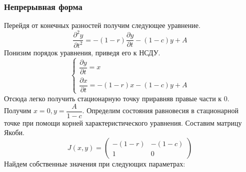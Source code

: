 \subsubsection{Непрерывная форма}
Перейдя от конечных разностей получим следующее уравнение.
\begin{equation}
  \dfrac{\partial^2y}{\partial t^2}=-(1-r)\dfrac{\partial y}{\partial t}-(1-c)y+A
\end{equation}
Понизим порядок уравнения, приведя его к НСДУ.
\begin{equation}
  \begin{cases}
    \dfrac{\partial y}{\partial t} = x\\
    \dfrac{\partial x}{\partial t} = -(1-r)x-(1-c)y+A
  \end{cases}
\end{equation}
Отсюда легко получить стационарную точку приравняв правые части к 0. Получим $x=0, y=\dfrac{A}{1-c}$.
Определим состояния равновесия в стационарной точке при помощи корней характеристического уравнения. Составим матрицу Якоби.
\begin{equation}
  J(x, y) = \begin{pmatrix}
    -(1-r)&-(1-c)\\1&0
  \end{pmatrix}
\end{equation}
Найдем собственные значения при следующих параметрах:
